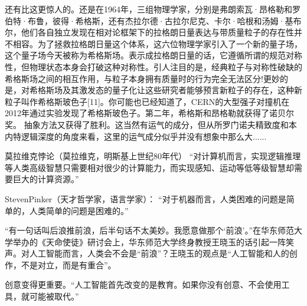 还有比这更惊人的。还是在1964年，三组物理学家，分别是弗朗索瓦·昂格勒和罗伯特·布鲁，彼得·希格斯，还有杰拉尔德·古拉尔尼克、卡尔·哈根和汤姆·基布尔，他们各自独立发现在相对论框架下的拉格朗日量表达与带质量粒子的存在性并不相容。为了拯救拉格朗日量这个体系，这六位物理学家引入了一个新的量子场，这个量子场今天被称为希格斯场。表示成拉格朗日量的话，它遵循所谓的规范对称性，但物理状态本身会打破这种对称性。引人注目的是，经典粒子与对称性破缺的希格斯场之间的相互作用，与粒子本身拥有质量时的行为完全无法区分!更妙的是，对希格斯场及其激发态的量子化让这些研究者能够预言新粒子的存在，这种新粒子叫作希格斯玻色子[11]。你可能也已经知道了，CERN的大型强子对撞机在2012年通过实验发现了希格斯玻色子。第二年，希格斯和昂格勒就获得了诺贝尔奖。
抽象方法又获得了胜利。这当然有运气的成分，但从所罗门诺夫精致度和本内特逻辑深度的角度来看，这里的运气成分似乎并没有想象中那么大......




莫拉维克悖论（莫拉维克，明斯基上世纪80年代）
“对计算机而言，实现逻辑推理等人类高级智慧只需要相对很少的计算能力，而实现感知、运动等低等级智慧却需要巨大的计算资源。”

StevenPinker（天才哲学家，语言学家）：
“对于机器而言，人类困难的问题是简单的，人类简单的问题是困难的。”

“有一句话叫后浪推前浪，后半句话不太美妙。我愿意做那个‘前浪’。”在华东师范大学举办的《天命使徒》研讨会上，华东师范大学终身教授王晓玉的话引起一阵笑声。对人工智能而言，人类会不会是“前浪”？王晓玉的观点是“人工智能和人的创作，不是对立，而是有重合”。

创意变得更重要。“人工智能首先改变的是教育。如果你没有创意、不会使用工具，就可能被取代。”